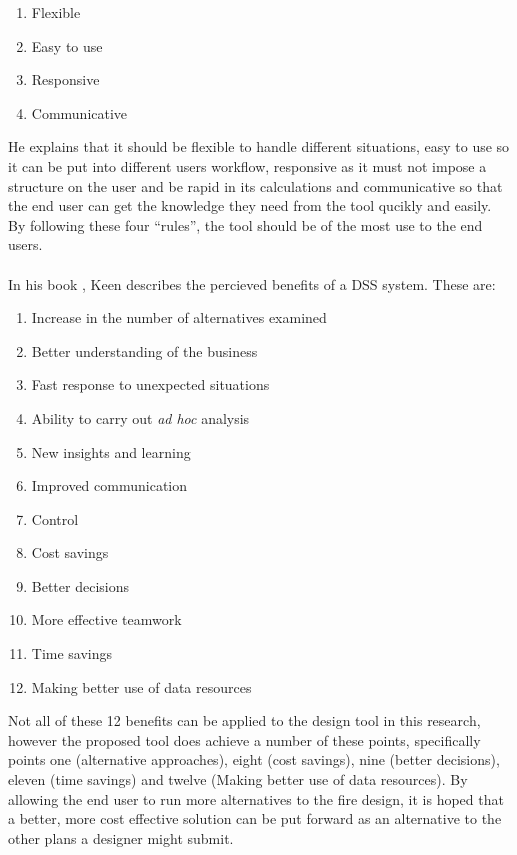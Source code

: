 \documentclass[table,a4paper,oneside]{book}
\begin{document}
\begin{enumerate}
\item Flexible
\item Easy to use
\item Responsive
\item Communicative
\end{enumerate}

He explains that it should be flexible to handle different situations, easy to use so it can be put into different users workflow, responsive as it must not impose a structure on the user and be rapid in its calculations and communicative so that the end user can get the knowledge they need from the tool qucikly and easily. By following these four ``rules'', the tool should be of the most use to the end users.
\\
\\
In his book \citep{Keen1980} , Keen describes the percieved benefits of a \ac{DSS} system. These are:

\begin{enumerate}
\item Increase in the number of alternatives examined
\item Better understanding of the business
\item Fast response to unexpected situations
\item Ability to carry out \emph{ad hoc} analysis
\item New insights and learning
\item Improved communication
\item Control
\item Cost savings
\item Better decisions
\item More effective teamwork
\item Time savings
\item Making better use of data resources
\end{enumerate}

Not all of these 12 benefits can be applied to the design tool in this research, however the proposed tool does achieve a number of these points, specifically points one (alternative approaches), eight (cost savings), nine (better decisions), eleven (time savings) and twelve (Making better use of data resources). By allowing the end user to run more alternatives to the fire design, it is hoped that a better, more cost effective solution can be put forward as an alternative to the other plans a designer might submit.
\end{document}
